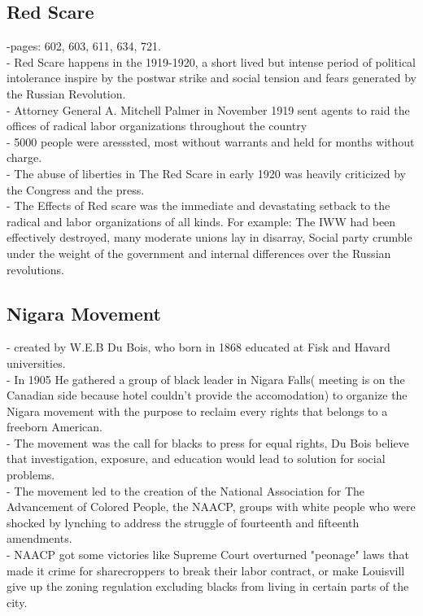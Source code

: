 \documentclass{article}
\begin{document}
\subsection{ Red Scare}
-pages: 602, 603, 611, 634, 721.\\
- Red Scare happens in the 1919-1920, a short lived but intense period of political intolerance inspire by the postwar strike and social tension and fears generated by the Russian Revolution.\\
- Attorney General A. Mitchell Palmer in November 1919 sent agents to raid the offices of radical labor organizations throughout the country\\
- 5000 people were aresssted, most without warrants and held for months without charge.\\
- The abuse of liberties in The Red Scare in early 1920 was heavily criticized by the Congress and the press.\\
- The Effects of Red scare was the immediate and devastating setback to the radical and labor organizations of all kinds. For example: The IWW had been effectively destroyed, many moderate unions lay in disarray, Social party crumble under the weight of the government and internal differences over the Russian revolutions.\\

\subsection{ Nigara Movement}
- created by W.E.B Du Bois, who born in 1868 educated at Fisk and Havard universities.\\
- In 1905 He gathered a group of black leader in Nigara Falls( meeting is on the Canadian side because hotel couldn't provide the accomodation) to organize the Nigara movement with the purpose to reclaim every rights that belongs to a freeborn American.\\
- The movement was the call for blacks to press for equal rights, Du Bois believe that investigation, exposure, and education would lead to solution for social problems.\\
- The movement led to the creation of the National Association for The Advancement of Colored People, the NAACP, groups with white people who were shocked by lynching to address the struggle of fourteenth and fifteenth amendments.\\
- NAACP got some victories like Supreme Court overturned "peonage" laws that made it crime for sharecroppers to break their labor contract, or make Louisvill give up the zoning regulation excluding blacks from living in certain parts of the city.\\
\end{document}
